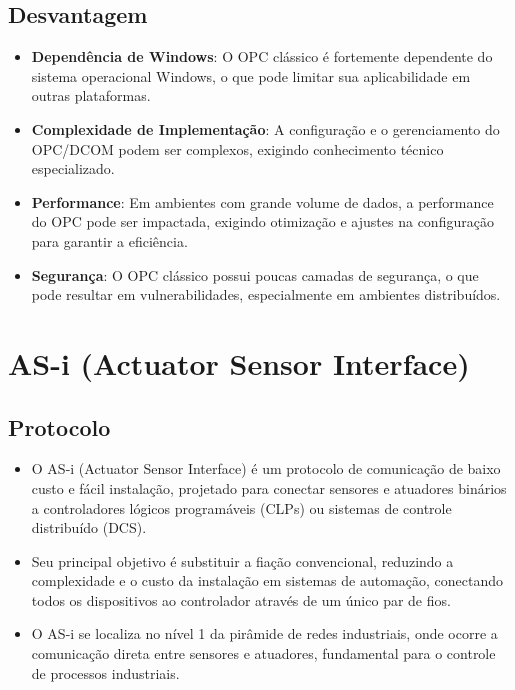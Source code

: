 \documentclass[a4paper,11pt]{article} %
\begin{document}
\subsection{Desvantagem}
\begin{itemize}
    \item \textbf{Dependência de Windows}: O OPC clássico é fortemente dependente do sistema operacional Windows, o que pode limitar sua aplicabilidade em outras plataformas.
    \item \textbf{Complexidade de Implementação}: A configuração e o gerenciamento do OPC/DCOM podem ser complexos, exigindo conhecimento técnico especializado.
    \item \textbf{Performance}: Em ambientes com grande volume de dados, a performance do OPC pode ser impactada, exigindo otimização e ajustes na configuração para garantir a eficiência.
    \item \textbf{Segurança}: O OPC clássico possui poucas camadas de segurança, o que pode resultar em vulnerabilidades, especialmente em ambientes distribuídos.
\end{itemize}



\section{AS-i (Actuator Sensor Interface)}

\subsection{Protocolo}
\begin{itemize}
    \item O AS-i (Actuator Sensor Interface) é um protocolo de comunicação de baixo custo e fácil instalação, projetado para conectar sensores e atuadores binários a controladores lógicos programáveis (CLPs) ou sistemas de controle distribuído (DCS).
    \item Seu principal objetivo é substituir a fiação convencional, reduzindo a complexidade e o custo da instalação em sistemas de automação, conectando todos os dispositivos ao controlador através de um único par de fios.
    \item O AS-i se localiza no nível 1 da pirâmide de redes industriais, onde ocorre a comunicação direta entre sensores e atuadores, fundamental para o controle de processos industriais.
\end{itemize}
\end{document}
